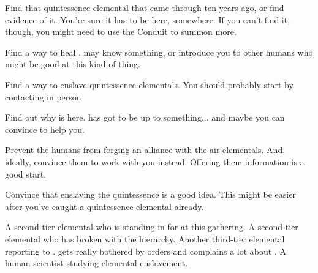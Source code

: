 \documentclass[char]{elementals}
\begin{document}
\begin{itemz}[Goals]
	\item Find that quintessence elemental that came through ten years ago, or find evidence of it.  You're sure it has to be here, somewhere. If you can't find it, though, you might need to use the Conduit to summon more.
	\item Find a way to heal \cEarthKing{}.  \cMS{} may know something, or introduce you to other humans who might be good at this kind of thing.
	\item Find a way to enslave quintessence elementals.  You should probably start by contacting \cMS{} in person
	\item Find out why \cRogue{} is here.  \cRogue{\They} has got to be up to something... and maybe you can convince \cRogue{\them} to help you.
	\item Prevent the humans from forging an alliance with the air elementals.  And, ideally, convince them to work with you instead.  Offering them information is a good start.
	\item Convince \cLoyal{} that enslaving the quintessence is a good idea.  This might be easier after you've caught a quintessence elemental already.
\end{itemz}

\begin{contacts}
	\contact{\cLoyal{}}  A second-tier elemental who is standing in for \cEarthKing{} at this gathering.
	\contact{\cRogue{}}  A second-tier elemental who has broken with the hierarchy.
  \contact{\cMiniEarth{}}  Another third-tier elemental reporting to \cLoyal{}.  \cMiniEarth{\They} gets really bothered by orders and complains a lot about \cLoyal{}.
	\contact{\cMS{}}  A human scientist studying elemental enslavement.
\end{contacts}
\end{document}
